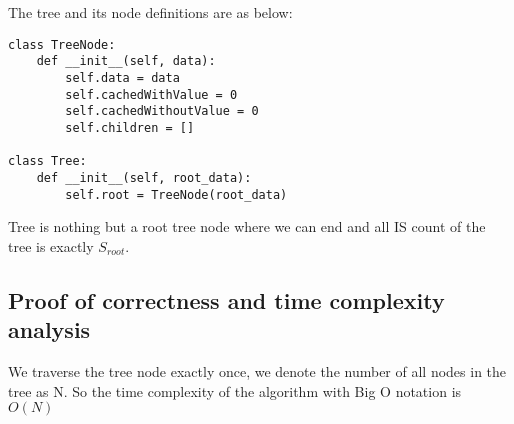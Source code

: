 \documentclass{article}
\begin{document}
The tree and its node definitions are as below:

\begin{lstlisting}
class TreeNode:
    def __init__(self, data):
        self.data = data
        self.cachedWithValue = 0
        self.cachedWithoutValue = 0
        self.children = []

class Tree:
    def __init__(self, root_data):
        self.root = TreeNode(root_data)
\end{lstlisting}

Tree is nothing but a root tree node where we can end and all IS count of the tree is exactly $S_{root}$.

\subsection*{Proof of correctness and time complexity analysis}
We traverse the tree node exactly once, we denote the number of all nodes in the tree as N. So the time complexity of the algorithm with Big O notation is $O(N)$
\end{document}
